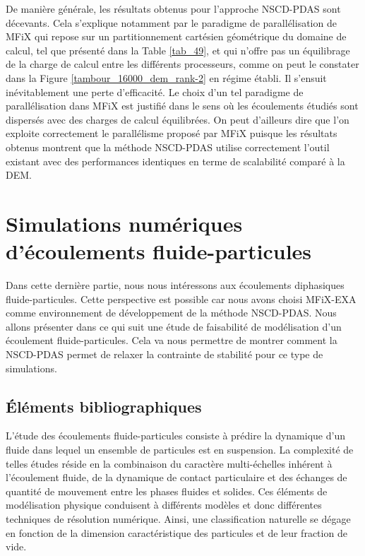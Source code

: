 De manière générale, les résultats obtenus pour l'approche NSCD-PDAS sont décevants. Cela s'explique notamment par le paradigme de parallélisation de MFiX qui repose sur un partitionnement cartésien géométrique du domaine de calcul, tel que présenté dans la Table \ref{tab_49}, et qui n'offre pas un équilibrage de la charge de calcul entre les différents processeurs, comme on peut le constater dans la Figure \ref{tambour_16000_dem_rank-2} en régime établi. Il s'ensuit inévitablement une perte d'efficacité. Le choix d'un tel paradigme de parallélisation dans MFiX est justifié dans le sens où les écoulements étudiés sont dispersés avec des charges de calcul équilibrées. On peut d'ailleurs dire que l'on exploite correctement le parallélisme proposé par MFiX puisque les résultats obtenus montrent que la méthode NSCD-PDAS utilise correctement l'outil existant avec des performances identiques en terme de scalabilité comparé à la DEM.

\section{Simulations numériques d'écoulements fluide-particules}\label{section_fluide}

Dans cette dernière partie, nous nous intéressons aux écoulements diphasiques fluide-particules. Cette perspective est possible car nous avons choisi MFiX-EXA comme environnement de développement de la méthode NSCD-PDAS. Nous allons présenter dans ce qui suit une étude de faisabilité de modélisation d'un écoulement fluide-particules. Cela va nous permettre de montrer comment la NSCD-PDAS permet de relaxer la contrainte de stabilité pour ce type de simulations.

\subsection{Éléments bibliographiques}

L'étude des écoulements fluide-particules consiste à prédire la dynamique d'un fluide dans lequel un ensemble de particules est en suspension.
La complexité de telles études réside en la combinaison  du caractère multi-échelles inhérent à l'écoulement fluide, de la dynamique de contact  particulaire et des échanges de quantité de mouvement entre les phases fluides et solides. Ces éléments de modélisation physique conduisent à différents modèles et donc différentes techniques de résolution numérique.
Ainsi, une classification naturelle se dégage en fonction de la dimension caractéristique des particules et de leur fraction de vide.\\

